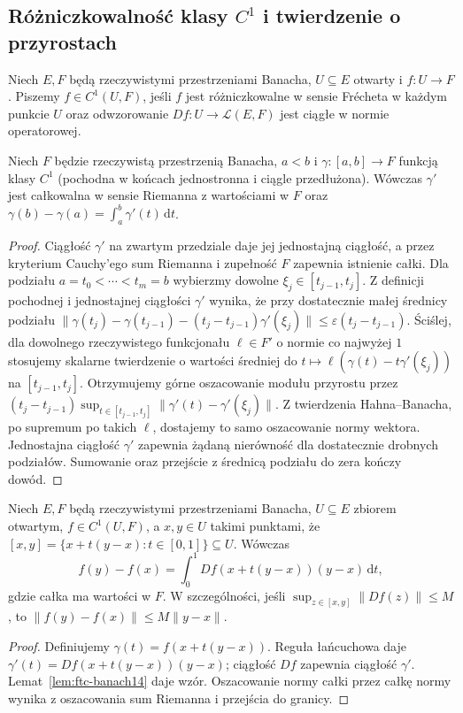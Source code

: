 \subsection{Różniczkowalność klasy \texorpdfstring{$C^1$}{C1} i twierdzenie o przyrostach}

\begin{definicja}[Klasa $C^1$]
\label{def:c1-14}
Niech $E,F$ będą rzeczywistymi przestrzeniami Banacha, $U\subseteq E$ otwarty i $f:U\to F$. Piszemy $f\in C^1(U,F)$, jeśli $f$ jest różniczkowalne w sensie Frécheta w każdym punkcie $U$ oraz odwzorowanie $Df:U\to\mathcal L(E,F)$ jest ciągłe w normie operatorowej.
\end{definicja}

\begin{lemat}
\label{lem:ftc-banach14}
Niech $F$ będzie rzeczywistą przestrzenią Banacha, $a<b$ i $\gamma:[a,b]\to F$ funkcją klasy $C^1$ (pochodna w końcach jednostronna i ciągle przedłużona). Wówczas $\gamma'$ jest całkowalna w sensie Riemanna z wartościami w $F$ oraz
$\gamma(b)-\gamma(a)=\int_a^b\gamma'(t)\,\mathrm dt$.
\end{lemat}
\begin{proof}
Ciągłość $\gamma'$ na zwartym przedziale daje jej jednostajną ciągłość, a przez kryterium Cauchy'ego sum Riemanna i zupełność $F$ zapewnia istnienie całki. Dla podziału $a=t_0<\cdots<t_m=b$ wybierzmy dowolne $\xi_j\in[t_{j-1},t_j]$. Z definicji pochodnej i jednostajnej ciągłości $\gamma'$ wynika, że przy dostatecznie małej średnicy podziału
$\|\gamma(t_j)-\gamma(t_{j-1})-(t_j-t_{j-1})\gamma'(\xi_j)\|\le\varepsilon(t_j-t_{j-1})$.
Ściślej, dla dowolnego rzeczywistego funkcjonału $\ell\in F'$ o normie co najwyżej $1$ stosujemy skalarne twierdzenie o wartości średniej do $t\mapsto\ell(\gamma(t)-t\gamma'(\xi_j))$ na $[t_{j-1},t_j]$. Otrzymujemy górne oszacowanie modułu przyrostu przez $(t_j-t_{j-1})\sup_{t\in[t_{j-1},t_j]}\|\gamma'(t)-\gamma'(\xi_j)\|$. Z twierdzenia Hahna--Banacha, po supremum po takich $\ell$, dostajemy to samo oszacowanie normy wektora. Jednostajna ciągłość $\gamma'$ zapewnia żądaną nierówność dla dostatecznie drobnych podziałów. Sumowanie oraz przejście z średnicą podziału do zera kończy dowód.
\end{proof}

\begin{twierdzenie}
\label{thm:mean-value14}
Niech $E,F$ będą rzeczywistymi przestrzeniami Banacha, $U\subseteq E$ zbiorem otwartym, $f\in C^1(U,F)$, a $x,y\in U$ takimi punktami, że $[x,y]=\{x+t(y-x):t\in[0,1]\}\subseteq U$. Wówczas
\[
f(y)-f(x)=\int_0^1 Df(x+t(y-x))(y-x)\,\mathrm dt,
\]
gdzie całka ma wartości w $F$. W szczególności, jeśli $\sup_{z\in[x,y]}\|Df(z)\|\le M$, to $\|f(y)-f(x)\|\le M\|y-x\|$.
\end{twierdzenie}
\begin{proof}
Definiujemy $\gamma(t)=f(x+t(y-x))$. Reguła łańcuchowa daje $\gamma'(t)=Df(x+t(y-x))(y-x)$; ciągłość $Df$ zapewnia ciągłość $\gamma'$. Lemat~\ref{lem:ftc-banach14} daje wzór. Oszacowanie normy całki przez całkę normy wynika z oszacowania sum Riemanna i przejścia do granicy.
\end{proof}


